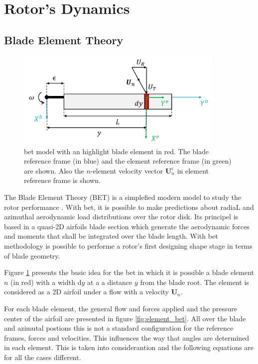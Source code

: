 
\section{Rotor's Dynamics}
\label{section:rotor_dynamics}

\subsection{Blade Element Theory}
\label{section:bet}


\begin{figure}[!htb]
    \centering
    \includegraphics[width=10cm]{Figures/background/bet/blade.png}
    \caption{\gls{bet} model with an highlight blade element in red. The blade reference frame (in blue) and the element reference frame (in green) are shown. Also the $n$-element velocity vector $\mathbf{U}^e_n$ in element reference frame is shown.}
    \label{fig:blade_bet}
\end{figure}

The Blade Element Theory (BET) is a simplefied modern model to study the rotor performance \cite{leishman_principles_2006}. With \gls{bet}, it is possible to make predictions about radiaL and azimuthal aerodynamic load distributions over the rotor disk. Its principel is based in a quasi-2D airfoils blade section which generate the aerodynamic forces and moments that shall be integrated over the blade length. With \gls{bet} methodology is possible to performe a rotor's first designing shape stage in terms of blade geometry.

Figure \ref{fig:blade_bet} presents the basic idea for the \gls{bet} in which it is possible a blade element $n$ (in red) with a width $\mathrm{d}y$ at a a distance $y$ from the blade root. The element is considered as a 2D airfoil under a flow with a velocity $\mathbf{U}_n$.

For each blade element, the general flow and forces applied and the pressure center of the airfoil are presented in figure \ref{fig:element_bet}. All over the blade and azimutal postions this is not a standard configuration for the reference frames, forces and velocities. This influences the way that angles are determined in each element. This is taken into considerantion and the following equations are for all the cases different.


